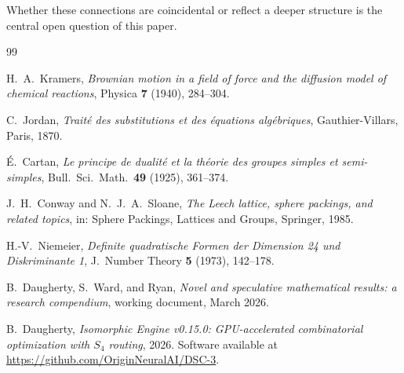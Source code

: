 \documentclass[11pt]{amsart}
\theoremstyle{definition}
\begin{document}
Whether these connections are coincidental or reflect a deeper structure is the central open question of this paper.



\begin{thebibliography}{99}

H.~A.~Kramers, \emph{Brownian motion in a field of force and the diffusion model of chemical reactions}, Physica \textbf{7} (1940), 284--304.

C.~Jordan, \emph{Trait\'e des substitutions et des \'equations alg\'ebriques}, Gauthier-Villars, Paris, 1870.

\'E.~Cartan, \emph{Le principe de dualit\'e et la th\'eorie des groupes simples et semi-simples}, Bull.\ Sci.\ Math.\ \textbf{49} (1925), 361--374.

J.~H.~Conway and N.~J.~A.~Sloane, \emph{The Leech lattice, sphere packings, and related topics}, in: Sphere Packings, Lattices and Groups, Springer, 1985.

H.-V.~Niemeier, \emph{Definite quadratische Formen der Dimension 24 und Diskriminante 1}, J.\ Number Theory \textbf{5} (1973), 142--178.

B.~Daugherty, S.~Ward, and Ryan, \emph{Novel and speculative mathematical results: a research compendium}, working document, March 2026.

B.~Daugherty, \emph{Isomorphic Engine v0.15.0: GPU-accelerated combinatorial optimization with $S_4$ routing}, 2026. Software available at \url{https://github.com/OriginNeuralAI/DSC-3}.

\end{thebibliography}
\end{document}
